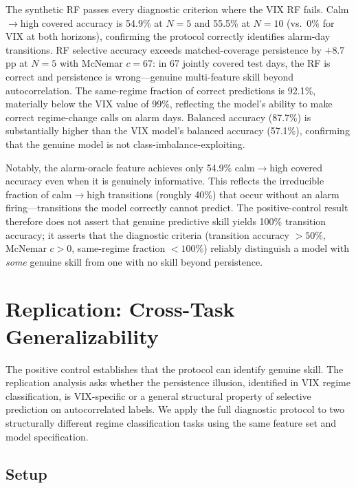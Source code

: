 \documentclass[11pt]{article}
\begin{document}
The synthetic RF passes every diagnostic criterion where the VIX RF fails. Calm$\to$high covered accuracy is 54.9\% at $N = 5$ and 55.5\% at $N = 10$ (vs.\ 0\% for VIX at both horizons), confirming the protocol correctly identifies alarm-day transitions. RF selective accuracy exceeds matched-coverage persistence by $+8.7$ pp at $N = 5$ with McNemar $c = 67$: in 67 jointly covered test days, the RF is correct and persistence is wrong---genuine multi-feature skill beyond autocorrelation. The same-regime fraction of correct predictions is 92.1\%, materially below the VIX value of 99\%, reflecting the model's ability to make correct regime-change calls on alarm days. Balanced accuracy (87.7\%) is substantially higher than the VIX model's balanced accuracy (57.1\%), confirming that the genuine model is not class-imbalance-exploiting.

Notably, the alarm-oracle feature achieves only 54.9\% calm$\to$high covered accuracy even when it is genuinely informative. This reflects the irreducible fraction of calm$\to$high transitions (roughly 40\%) that occur without an alarm firing---transitions the model correctly cannot predict. The positive-control result therefore does not assert that genuine predictive skill yields 100\% transition accuracy; it asserts that the diagnostic criteria (transition accuracy $> 50\%$, McNemar $c > 0$, same-regime fraction $< 100\%$) reliably distinguish a model with \emph{some} genuine skill from one with no skill beyond persistence.

\section{Replication: Cross-Task Generalizability}
\label{sec:replication}

The positive control establishes that the protocol can identify genuine skill. The replication analysis asks whether the persistence illusion, identified in VIX regime classification, is VIX-specific or a general structural property of selective prediction on autocorrelated labels. We apply the full diagnostic protocol to two structurally different regime classification tasks using the same feature set and model specification.

\subsection{Setup}
\end{document}
